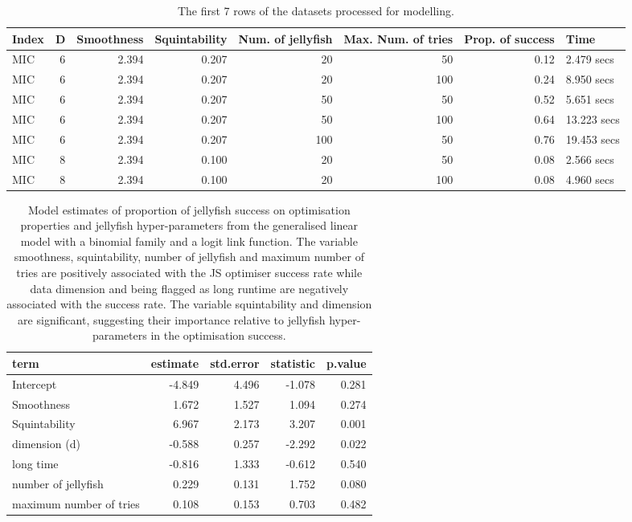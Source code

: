 \documentclass[
  number,
  preprint,
  3p]{elsarticle}
\begin{document}
\endgroup{}

\begingroup\fontsize{7}{9}\selectfont

\begin{longtable}[t]{lrrrrrrl}

\caption{\label{tbl-mod-data}The first 7 rows of the datasets processed
for modelling.}

\tabularnewline

\toprule
Index & D & Smoothness & Squintability & Num. of jellyfish & Max. Num. of tries & Prop. of success & Time\\
\midrule
MIC & 6 & 2.394 & 0.207 & 20 & 50 & 0.12 & 2.479 secs\\
MIC & 6 & 2.394 & 0.207 & 20 & 100 & 0.24 & 8.950 secs\\
MIC & 6 & 2.394 & 0.207 & 50 & 50 & 0.52 & 5.651 secs\\
MIC & 6 & 2.394 & 0.207 & 50 & 100 & 0.64 & 13.223 secs\\
MIC & 6 & 2.394 & 0.207 & 100 & 50 & 0.76 & 19.453 secs\\
\addlinespace
MIC & 8 & 2.394 & 0.100 & 20 & 50 & 0.08 & 2.566 secs\\
MIC & 8 & 2.394 & 0.100 & 20 & 100 & 0.08 & 4.960 secs\\
\bottomrule

\end{longtable}

\endgroup{}

\begin{longtable}[t]{|>{}lrrr>{}r|}

\caption{\label{tbl-mod-output}Model estimates of proportion of
jellyfish success on optimisation properties and jellyfish
hyper-parameters from the generalised linear model with a binomial
family and a logit link function. The variable smoothness,
squintability, number of jellyfish and maximum number of tries are
positively associated with the JS optimiser success rate while data
dimension and being flagged as long runtime are negatively associated
with the success rate. The variable squintability and dimension are
significant, suggesting their importance relative to jellyfish
hyper-parameters in the optimisation success.}

\tabularnewline

\toprule
term & estimate & std.error & statistic & p.value\\
\midrule
Intercept & -4.849 & 4.496 & -1.078 & 0.281\\
Smoothness & 1.672 & 1.527 & 1.094 & 0.274\\
Squintability & 6.967 & 2.173 & 3.207 & 0.001\\
dimension (d) & -0.588 & 0.257 & -2.292 & 0.022\\
long time & -0.816 & 1.333 & -0.612 & 0.540\\
\addlinespace
number of jellyfish & 0.229 & 0.131 & 1.752 & 0.080\\
maximum number of tries & 0.108 & 0.153 & 0.703 & 0.482\\
\bottomrule

\end{longtable}
\end{document}
